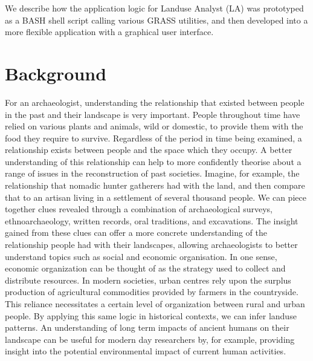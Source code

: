 We describe how the application logic for Landuse Analyst (LA) was prototyped as a
BASH shell script calling various GRASS utilities, and then developed into a
more flexible application with a graphical user interface.

\section{Background} \label{sec:Background} For an archaeologist, understanding
the relationship that existed between people in the past and their landscape is
very important.  People throughout time have relied on various plants and
animals, wild or domestic, to provide them with the food they require to
survive.  Regardless of the period in time being examined, a relationship
exists between people and the space which they occupy.  A better understanding
of this relationship can help to more confidently theorise about a range of
issues in the reconstruction of past societies.  Imagine, for example, the
relationship that nomadic hunter gatherers had with the land, and then compare
that to  an artisan living in a settlement of several thousand people.  We can
piece together clues revealed through a combination of archaeological surveys,
ethnoarchaeology, written records, oral traditions, and excavations. The
insight gained from these clues can offer a more concrete understanding of the
relationship people had with their landscapes, allowing archaeologists to
better understand topics such as social and economic organisation.  In
one sense, economic organization can be thought of as the strategy used to
collect and distribute resources.  In modern societies, urban centres rely upon
the surplus production of agricultural commodities provided by farmers in the
countryside.  This reliance necessitates a certain level of organization
between rural and urban people.  By applying this same logic in historical
contexts, we can infer landuse patterns.  An understanding of long
term impacts of ancient humans on their landscape can be useful for modern day
researchers by, for example, providing insight into the potential environmental impact of
current human activities.

